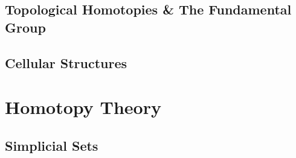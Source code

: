 

\chapter{Topological Homotopies \& The Fundamental Group}



\chapter{Cellular Structures}



\part{Homotopy Theory}

\chapter{Simplicial Sets}






% 


% 
% 



% 
% 
% 
% 
% 


% 

\backmatter

\printbibliography



